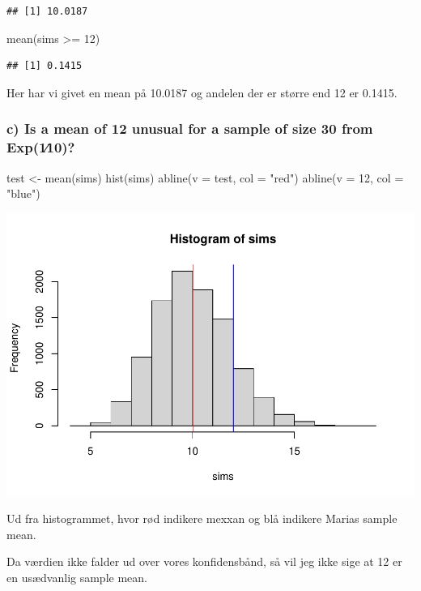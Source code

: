 \documentclass[
  a4paper]{article}
\newenvironment{Shaded}{\begin{snugshade}}{\end{snugshade}}
\newcommand{\AttributeTok}[1]{\textcolor[rgb]{0.77,0.63,0.00}{#1}}
\newcommand{\DecValTok}[1]{\textcolor[rgb]{0.00,0.00,0.81}{#1}}
\newcommand{\FunctionTok}[1]{\textcolor[rgb]{0.00,0.00,0.00}{#1}}
\newcommand{\NormalTok}[1]{#1}
\newcommand{\OtherTok}[1]{\textcolor[rgb]{0.56,0.35,0.01}{#1}}
\newcommand{\SpecialCharTok}[1]{\textcolor[rgb]{0.00,0.00,0.00}{#1}}
\newcommand{\StringTok}[1]{\textcolor[rgb]{0.31,0.60,0.02}{#1}}
\begin{document}
\begin{verbatim}
## [1] 10.0187
\end{verbatim}

\begin{Shaded}
\begin{Highlighting}[]
\FunctionTok{mean}\NormalTok{(sims }\SpecialCharTok{\textgreater{}=} \DecValTok{12}\NormalTok{)}
\end{Highlighting}
\end{Shaded}

\begin{verbatim}
## [1] 0.1415
\end{verbatim}

Her har vi givet en mean på 10.0187 og andelen der er større end 12 er
0.1415.

\hypertarget{c-is-a-mean-of-12-unusual-for-a-sample-of-size-30-from-exp110}{%
\subsubsection{c) Is a mean of 12 unusual for a sample of size 30 from
Exp(1∕10)?}\label{c-is-a-mean-of-12-unusual-for-a-sample-of-size-30-from-exp110}}

\begin{Shaded}
\begin{Highlighting}[]
\NormalTok{test }\OtherTok{\textless{}{-}} \FunctionTok{mean}\NormalTok{(sims)}
\FunctionTok{hist}\NormalTok{(sims)}
\FunctionTok{abline}\NormalTok{(}\AttributeTok{v =}\NormalTok{ test, }\AttributeTok{col =} \StringTok{"red"}\NormalTok{)}
\FunctionTok{abline}\NormalTok{(}\AttributeTok{v =} \DecValTok{12}\NormalTok{, }\AttributeTok{col =} \StringTok{"blue"}\NormalTok{)}
\end{Highlighting}
\end{Shaded}

\includegraphics{Aflevering3-skabelon_files/figure-latex/unnamed-chunk-2-1.pdf}

Ud fra histogrammet, hvor rød indikere mexxan og blå indikere Marias
sample mean.

Da værdien ikke falder ud over vores konfidensbånd, så vil jeg ikke sige
at 12 er en usædvanlig sample mean.
\end{document}
